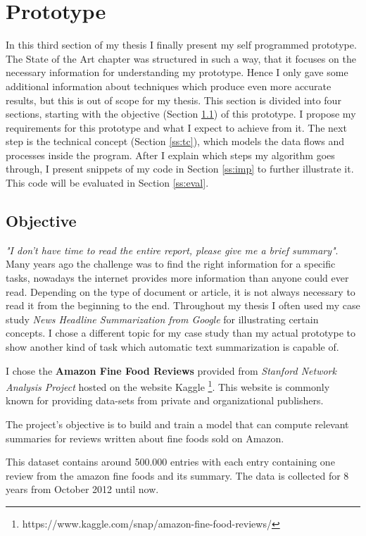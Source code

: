 \chapter{Prototype}\label{ch:proto}

In this third section of my thesis I finally present my self programmed prototype. The State of the Art chapter was structured in such a way, that it focuses on the necessary information for understanding my prototype. Hence I only gave some additional information about techniques which produce even more accurate results, but this is out of scope for my thesis. This section is divided into four sections, starting with the objective (Section \ref{ss:obj}) of this prototype. I propose my requirements for this prototype and what I expect to achieve from it. The next step is the technical concept (Section \ref{ss:tc}), which models the data flows and processes inside the program. After I explain which steps my algorithm goes through, I present snippets of my code in Section \ref{ss:imp} to further illustrate it. This code will be evaluated in Section \ref{ss:eval}.

\section{Objective}\label{ss:obj}

\textit{"I don't have time to read the entire report, please give me a brief summary"}. Many years ago the challenge was to find the right information for a specific tasks, nowadays the internet provides more information than anyone could ever read. Depending on the type of document or article, it is not always necessary to read it from the beginning to the end. Throughout my thesis I often used my case study \textit{News Headline Summarization from Google} for illustrating certain concepts. I chose a different topic for my case study than my actual prototype to show another kind of task which automatic text summarization is capable of.

I chose the \textbf{Amazon Fine Food Reviews} provided from \textit{Stanford Network Analysis Project} hosted on the website Kaggle \footnote{https://www.kaggle.com/snap/amazon-fine-food-reviews/}. This website is commonly known for providing data-sets from private and organizational publishers. 

The project's objective is to build and train a model that can compute relevant summaries for reviews written about fine foods sold on Amazon. 

This dataset contains around 500.000 entries with each entry containing one review from the amazon fine foods and its summary. The data is collected for 8 years from October 2012 until now. 

